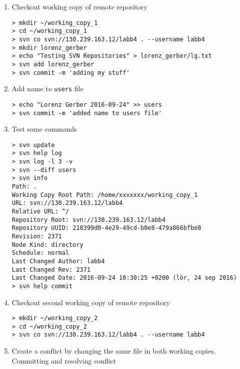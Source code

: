 \documentclass[a4paper,11pt,twoside]{article}
\begin{document}
\begin{enumerate}
\item
Checkout working copy of remote repository
  
\begin{verbatim}
> mkdir ~/working_copy_1
> cd ~/working_copy_1
> svn co svn://130.239.163.12/labb4 . --username labb4
> mkdir lorenz_gerber
> echo "Testing SVN Repositories" > lorenz_gerber/lg.txt
> svn add lorenz_gerber
> svn commit -m 'adding my stuff'
\end{verbatim}

\item
  Add name to \verb!users! file

\begin{verbatim}
> echo "Lorenz Gerber 2016-09-24" >> users
> svn commit -m 'added name to users file'
\end{verbatim}

\item
  Test some commands

\begin{verbatim}
> svn update
> svn help log
> svn log -l 3 -v
> svn --diff users
> svn info
Path: .
Working Copy Root Path: /home/xxxxxxx/working_copy_1
URL: svn://130.239.163.12/labb4
Relative URL: ^/
Repository Root: svn://130.239.163.12/labb4
Repository UUID: 218399d0-4e29-49cd-b0e8-479a866bfbe8
Revision: 2371
Node Kind: directory
Schedule: normal
Last Changed Author: labb4
Last Changed Rev: 2371
Last Changed Date: 2016-09-24 10:30:25 +0200 (lör, 24 sep 2016)
> svn help commit
\end{verbatim}

\item
  Checkout second working copy of remote repository

\begin{verbatim}
> mkdir ~/working_copy_2
> cd ~/working_copy_2
> svn co svn://130.239.163.12/labb4 . --username labb4

\end{verbatim}


\item
  Create a conflict by changing the same file in both working copies. Committing and resolving conflict


\end{enumerate}
\end{document}
